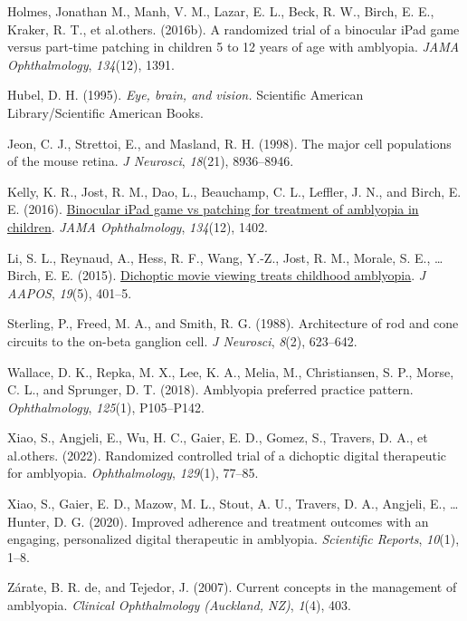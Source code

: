 \documentclass[
  onecolumn]{article}
\newlength{\cslhangindent}
\newenvironment{CSLReferences}[2] %
 {%
  \setlength{\parindent}{0pt}
  \ifodd #1 \everypar{\setlength{\hangindent}{\cslhangindent}}\ignorespaces\fi
  \ifnum #2 > 0
  \setlength{\parskip}{#2\baselineskip}
  \fi
 }%
 {}
\begin{document}
\begin{CSLReferences}{1}{0}
\leavevmode{}%
Holmes, Jonathan M., Manh, V. M., Lazar, E. L., Beck, R. W., Birch, E.
E., Kraker, R. T., et al.others. (2016b). A randomized trial of a
binocular iPad game versus part-time patching in children 5 to 12 years
of age with amblyopia. \emph{JAMA Ophthalmology}, \emph{134}(12), 1391.

\leavevmode{}%
Hubel, D. H. (1995). \emph{Eye, brain, and vision.} Scientific American
Library/Scientific American Books.

\leavevmode{}%
Jeon, C. J., Strettoi, E., and Masland, R. H. (1998). {The major cell
populations of the mouse retina}. \emph{J Neurosci}, \emph{18}(21),
8936--8946.

\leavevmode{}%
Kelly, K. R., Jost, R. M., Dao, L., Beauchamp, C. L., Leffler, J. N.,
and Birch, E. E. (2016).
\href{https://doi.org/10.1001/jamaophthalmol.2016.4224}{Binocular iPad
game vs patching for treatment of amblyopia in children}. \emph{JAMA
Ophthalmology}, \emph{134}(12), 1402.

\leavevmode{}%
Li, S. L., Reynaud, A., Hess, R. F., Wang, Y.-Z., Jost, R. M., Morale,
S. E., \ldots{} Birch, E. E. (2015).
\href{https://doi.org/10.1016/j.jaapos.2015.08.003}{Dichoptic movie
viewing treats childhood amblyopia}. \emph{J AAPOS}, \emph{19}(5),
401--5.

\leavevmode{}%
Sterling, P., Freed, M. A., and Smith, R. G. (1988). {Architecture of
rod and cone circuits to the on-beta ganglion cell}. \emph{J Neurosci},
\emph{8}(2), 623--642.

\leavevmode{}%
Wallace, D. K., Repka, M. X., Lee, K. A., Melia, M., Christiansen, S.
P., Morse, C. L., and Sprunger, D. T. (2018). Amblyopia preferred
practice pattern{\textregistered}. \emph{Ophthalmology}, \emph{125}(1),
P105--P142.

\leavevmode{}%
Xiao, S., Angjeli, E., Wu, H. C., Gaier, E. D., Gomez, S., Travers, D.
A., et al.others. (2022). Randomized controlled trial of a dichoptic
digital therapeutic for amblyopia. \emph{Ophthalmology}, \emph{129}(1),
77--85.

\leavevmode{}%
Xiao, S., Gaier, E. D., Mazow, M. L., Stout, A. U., Travers, D. A.,
Angjeli, E., \ldots{} Hunter, D. G. (2020). Improved adherence and
treatment outcomes with an engaging, personalized digital therapeutic in
amblyopia. \emph{Scientific Reports}, \emph{10}(1), 1--8.

\leavevmode{}%
Zárate, B. R. de, and Tejedor, J. (2007). Current concepts in the
management of amblyopia. \emph{Clinical Ophthalmology (Auckland, NZ)},
\emph{1}(4), 403.

\end{CSLReferences}
\end{document}
